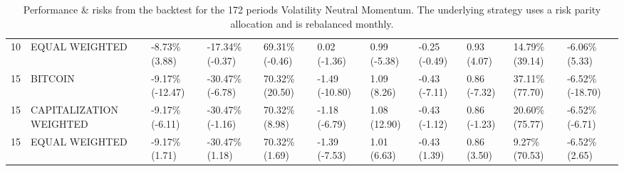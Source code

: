 \documentclass{article}
\begin{document}
\begin{landscape}
\begin{table}[H]
\begin{tabular}{p{0.4cm}|p{3cm}|p{1.65cm}|p{1.65cm}|p{1.65cm}|p{1.65cm}|p{1.65cm}|p{1.65cm}|p{1.65cm}|p{1.65cm}|p{1.65cm}}
\\ 
10&EQUAL WEIGHTED&-8.73\% (3.88)&-17.34\% (-0.37)&69.31\% (-0.46)&0.02 (-1.36)&0.99 (-5.38)&-0.25 (-0.49)&0.93 (4.07)&14.79\% (39.14)&-6.06\% (5.33)
\\ 
15&BITCOIN&-9.17\% (-12.47)&-30.47\% (-6.78)&70.32\% (20.50)&-1.49 (-10.80)&1.09 (8.26)&-0.43 (-7.11)&0.86 (-7.32)&37.11\% (77.70)&-6.52\% (-18.70)
\\ 
15&CAPITALIZATION WEIGHTED&-9.17\% (-6.11)&-30.47\% (-1.16)&70.32\% (8.98)&-1.18 (-6.79)&1.08 (12.90)&-0.43 (-1.12)&0.86 (-1.23)&20.60\% (75.77)&-6.52\% (-6.71)
\\ 
15&EQUAL WEIGHTED&-9.17\% (1.71)&-30.47\% (1.18)&70.32\% (1.69)&-1.39 (-7.53)&1.01 (6.63)&-0.43 (1.39)&0.86 (3.50)&9.27\% (70.53)&-6.52\% (2.65)
\\
    \bottomrule
  \end{tabular}
  \label{tab:volneutmom172riskparity}
   \caption{Performance \& risks from the backtest for the 172 periods Volatility Neutral Momentum. The underlying strategy uses a risk parity allocation and is rebalanced monthly.}
\end{table}
\end{landscape}
\end{document}
